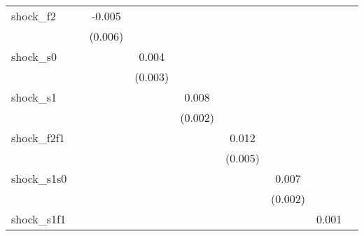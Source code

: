 {\begin{tabular}{l*{8}{c}}
\addlinespace
shock\_f2    &                     &      -0.005         &                     &                     &                     &                     &                     &                     \\
            &                     &     (0.006)         &                     &                     &                     &                     &                     &                     \\
\addlinespace
shock\_s0    &                     &                     &       0.004         &                     &                     &                     &                     &                     \\
            &                     &                     &     (0.003)         &                     &                     &                     &                     &                     \\
\addlinespace
shock\_s1    &                     &                     &                     &       0.008\sym{***}&                     &                     &                     &                     \\
            &                     &                     &                     &     (0.002)         &                     &                     &                     &                     \\
\addlinespace
shock\_f2f1  &                     &                     &                     &                     &       0.012\sym{**} &                     &                     &                     \\
            &                     &                     &                     &                     &     (0.005)         &                     &                     &                     \\
\addlinespace
shock\_s1s0  &                     &                     &                     &                     &                     &       0.007\sym{***}&                     &                     \\
            &                     &                     &                     &                     &                     &     (0.002)         &                     &                     \\
\addlinespace
shock\_s1f1  &                     &                     &                     &                     &                     &                     &       0.001         &                     \\

\end{tabular}}
